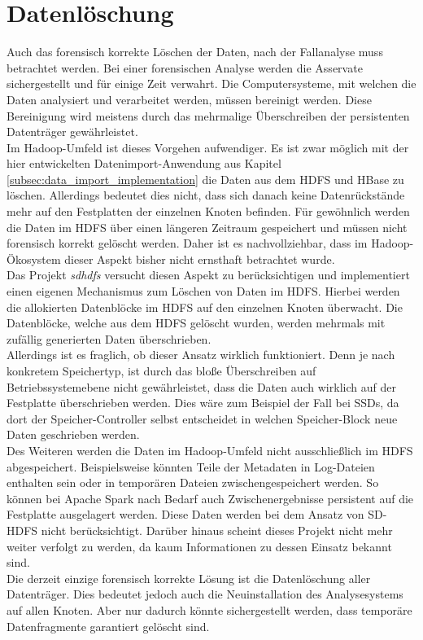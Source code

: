 \section{Datenlöschung}
Auch das forensisch korrekte Löschen der Daten, nach der Fallanalyse muss betrachtet werden. Bei einer forensischen Analyse werden die Asservate sichergestellt und für einige Zeit verwahrt. Die Computersysteme, mit welchen die Daten analysiert und verarbeitet werden, müssen bereinigt werden. Diese Bereinigung wird meistens durch das mehrmalige Überschreiben der persistenten Datenträger gewährleistet.\\
 Im Hadoop-Umfeld ist dieses Vorgehen aufwendiger. Es ist zwar möglich mit der hier entwickelten Datenimport-Anwendung aus Kapitel \ref{subsec:data_import_implementation} die Daten aus dem HDFS und HBase zu löschen. Allerdings bedeutet dies nicht, dass sich danach keine Datenrückstände mehr auf den Festplatten der einzelnen Knoten befinden.
Für gewöhnlich werden die Daten im HDFS über einen längeren Zeitraum gespeichert und müssen nicht forensisch korrekt gelöscht werden. Daher ist es nachvollziehbar, dass im Hadoop-Ökosystem dieser Aspekt bisher nicht ernsthaft betrachtet wurde.\\

\noindent
Das Projekt \textit{\gls{sdhdfs}} versucht diesen Aspekt zu berücksichtigen und implementiert einen eigenen Mechanismus zum Löschen von Daten im HDFS.\cite{sd_hdfs} Hierbei werden die allokierten Datenblöcke im HDFS auf den einzelnen Knoten überwacht. Die Datenblöcke, welche aus dem HDFS gelöscht wurden, werden mehrmals mit zufällig generierten Daten überschrieben.\\ 
Allerdings ist es fraglich, ob dieser Ansatz wirklich funktioniert. Denn je nach konkretem Speichertyp, ist durch das bloße Überschreiben auf Betriebssystemebene nicht gewährleistet, dass die Daten auch wirklich auf der Festplatte überschrieben werden. 
Dies wäre zum Beispiel der Fall bei SSDs, da dort der Speicher-Controller selbst entscheidet in welchen Speicher-Block neue Daten geschrieben werden.\\ 
Des Weiteren werden die Daten im Hadoop-Umfeld nicht ausschließlich im HDFS abgespeichert. Beispielsweise könnten Teile der Metadaten in Log-Dateien enthalten sein oder in temporären Dateien zwischengespeichert werden. 
So können bei Apache Spark nach Bedarf auch Zwischenergebnisse persistent auf die Festplatte ausgelagert werden.\cite{spark_rdd} Diese Daten werden bei dem Ansatz von SD-HDFS nicht berücksichtigt. Darüber hinaus scheint dieses Projekt nicht mehr weiter verfolgt zu werden, da kaum Informationen zu dessen Einsatz bekannt sind.\\

\noindent
Die  derzeit einzige forensisch korrekte Lösung ist die Datenlöschung aller Datenträger. Dies bedeutet jedoch auch die Neuinstallation des Analysesystems auf allen Knoten. Aber nur dadurch könnte sichergestellt werden, dass temporäre Datenfragmente garantiert gelöscht sind.  